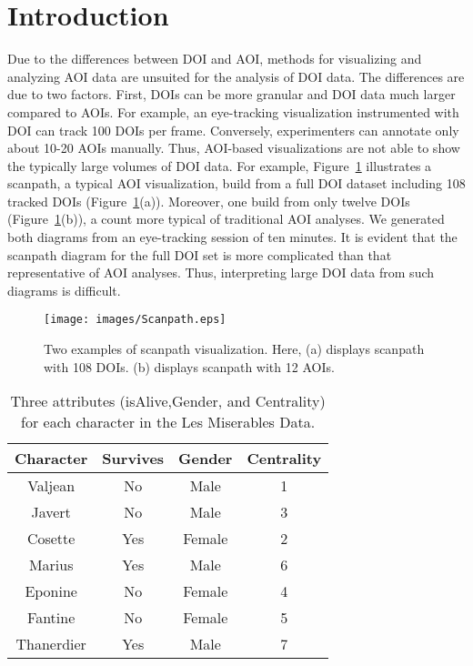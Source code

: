 \section{Introduction}
Due to the differences between DOI and AOI, methods for visualizing and analyzing AOI data are unsuited for the analysis of DOI data. The differences are due to two factors. First, DOIs can be more granular and DOI data much larger compared to AOIs. For example, an eye-tracking visualization instrumented with DOI can track 100 DOIs per frame. Conversely, experimenters can annotate only about 10-20 AOIs manually. Thus, AOI-based visualizations are not able to show the typically large volumes of DOI data. For example, Figure~\ref{fig:Scanpath} illustrates a scanpath, a typical AOI visualization,  build from a full DOI dataset including 108 tracked DOIs (Figure~\ref{fig:Scanpath}(a)). Moreover, one build from only twelve DOIs (Figure~\ref{fig:Scanpath}(b)), a count more typical of traditional AOI analyses. We generated both diagrams from an eye-tracking session of ten minutes. It is evident that the scanpath diagram for the full DOI set is more complicated than that representative of AOI analyses. Thus, interpreting large DOI data from such diagrams is difficult. 

\begin{figure}[htb]
  \centering
  \texttt{[image: images/Scanpath.eps]}
  \caption{Two examples of scanpath visualization. Here, (a) displays scanpath with 108 DOIs. (b) displays scanpath with 12 AOIs. }
	\label{fig:Scanpath}
\end{figure}

\begin{table}[htbp]
\caption{Three attributes (isAlive,Gender, and Centrality) for each character in the Les Miserables Data. }
	\centering
		\begin{tabular}{|c|c|c|c|}
				\hline
				\textbf{Character}	& \textbf{Survives} &	\textbf{Gender}	& \textbf{Centrality}\\\hline
			
				Valjean	& No	&Male	&1\\\hline
Javert	&No&	Male&	3\\\hline
Cosette 	&Yes	&Female&	2\\\hline
Marius	&Yes	&Male&	6\\\hline
Eponine	&No	&Female&	4\\\hline
Fantine	&No	&Female	&5\\\hline
Thanerdier	&Yes	&Male	&7\\\hline

		\end{tabular}
		
		\label{tab:LesMiserablesAttribute}
\end{table}

